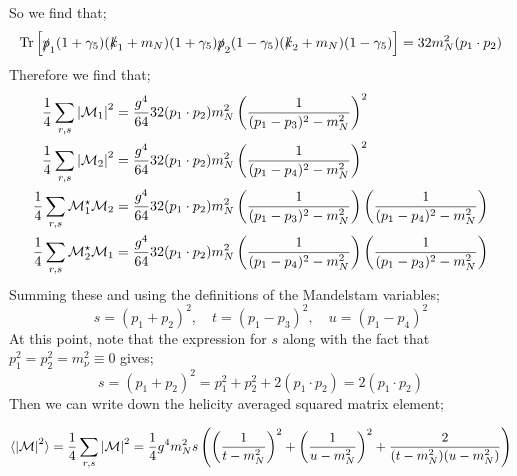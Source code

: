 \documentclass[10pt]{article}
\begin{document}
So we find that;
\begin{equation}
\text{Tr}\left[\slashed{p}_1(1 + \gamma_5)(\slashed{k}_1 + m_N)(1 + \gamma_5)\slashed{p}_2(1 - \gamma_5)(\slashed{k}_2 + m_N)(1 - \gamma_5)\right] = 32 m_N^2 (p_1 \cdot p_2)
\end{equation}
Therefore we find that;
\begin{align*}
\frac{1}{4}\sum_{r, s}{\left|\mathcal{M}_1\right|^2 }&=  \frac{g^4}{64}32(p_1 \cdot p_2)m_N^2 \left(\frac{1}{(p_1 - p_3)^2 - m_N^2}\right)^2 \\
\frac{1}{4}\sum_{r, s}{\left|\mathcal{M}_2\right|^2 }&=  \frac{g^4}{64}32(p_1 \cdot p_2)m_N^2 \left(\frac{1}{(p_1 - p_4)^2 - m_N^2}\right)^2 \\
\frac{1}{4}\sum_{r, s}{\mathcal{M}_1^\star \mathcal{M}_2}&=  \frac{g^4}{64}32(p_1 \cdot p_2)m_N^2 \left(\frac{1}{(p_1 - p_3)^2 - m_N^2}\right)\left(\frac{1}{(p_1 - p_4)^2 - m_N^2}\right) \\
\frac{1}{4}\sum_{r, s}{\mathcal{M}_2^\star \mathcal{M}_1}&=  \frac{g^4}{64}32(p_1 \cdot p_2)m_N^2 \left(\frac{1}{(p_1 - p_4)^2 - m_N^2}\right)\left(\frac{1}{(p_1 - p_3)^2 - m_N^2}\right) \\
\end{align*}
Summing these and using the definitions of the Mandelstam variables;
\begin{equation}
s = (p_1 + p_2)^2, \quad t = (p_1 - p_3)^2, \quad u = (p_1 - p_4)^2
\end{equation}
At this point, note that the expression for $s$ along with the fact that $p_1^2 = p_2^2 = m_\nu^2 \equiv 0$ gives;
\begin{equation*}
s = (p_1 + p_2)^2 = p_1^2 + p_2^2 + 2(p_1 \cdot p_2) = 2(p_1 \cdot p_2)
\end{equation*}
Then we can write down the helicity averaged squared matrix element;
\begin{examplebox1}
\begin{equation}
\label{eq:msquared}
\langle \left| \mathcal{M} \right|^2 \rangle = \frac{1}{4} \sum_{r, s}{\left| \mathcal{M} \right|^2} = \frac{1}{4}g^4 m_N^2 s \left(\left(\frac{1}{t - m_N^2}\right)^2 + \left(\frac{1}{u - m_N^2}\right)^2 + \frac{2}{(t - m_N^2)(u - m_N^2)}\right)
\end{equation}
\end{examplebox1}
\end{document}
